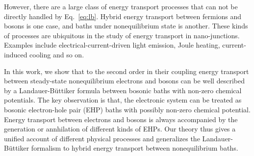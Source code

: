 \documentclass[aps
,twocolumn
,floatfix,footinbib,prl
]{revtex4-1}
\begin{document}
However, there are a large class of energy transport processes that can not be directly handled by Eq.~\ref{eq:lb}. 
Hybrid energy transport between fermions and bosons is one case, and baths under nonequilibrium state is another. These kinds of processes are ubiquitous in the study of energy transport in nano-junctions. Examples include electrical-current-driven light emission, Joule heating, current-induced cooling and so on. 

In this work, we show that to the second order in their coupling energy transport between steady-state nonequilibrium electrons and bosons can be well described by a Landauer-B\"uttiker formula between bosonic baths with non-zero chemical potentials. The key observation is that, the electronic system can be treated as bosonic electron-hole pair (EHP) baths with possibly non-zero chemical potential. Energy transport between electrons and bosons is always accompanied by the generation or annhilation of different kinds of EHPs. Our theory thus  gives a unified account of different physical processes and generalizes the Landauer-B\"uttiker formalism to hybrid energy transport between nonequilibrium baths.








\end{document}
